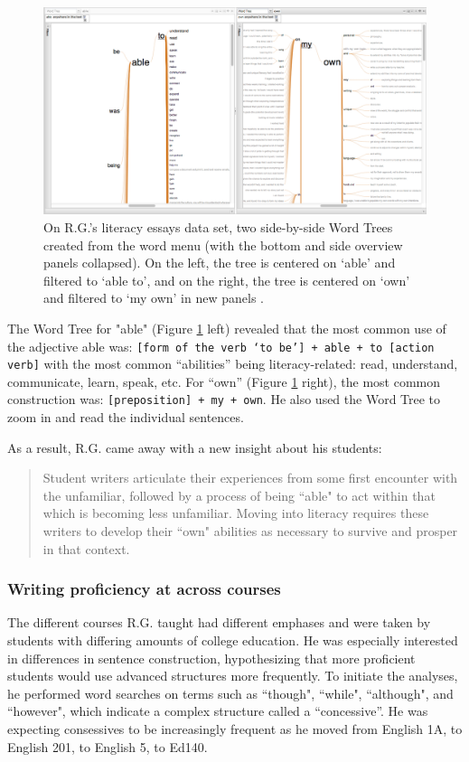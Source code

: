 \documentclass{sig-alternate}
\newcommand{\code}[1] {\texttt{#1}}
\begin{document}
\begin{figure}[h!]
\includegraphics[width=\textwidth]{fig/rex/04.png}
\caption{ On R.G.'s literacy essays data set, two side-by-side Word Trees created from the word menu (with the bottom and side overview panels collapsed). On the left, the tree is centered on `able' and filtered to `able to', and on the right, the tree is centered on  `own' and filtered to `my own' in new panels \label{fig:rex04}.}
\end{figure}

The Word Tree for "able" (Figure \ref{fig:rex04} left) revealed that the most common use of the adjective able was: \code{[form of the verb `to be'] + able + to [action verb]} with the most common ``abilities'' being literacy-related: read, understand, communicate, learn, speak, etc.  For ``own'' (Figure \ref{fig:rex04} right), the most common construction was: \code{[preposition] + my + own}.  He also used the Word Tree to zoom in and read the individual sentences.

As a result, R.G. came away with a new insight about his students:
\begin{quote}
Student writers articulate their experiences from some first encounter with the unfamiliar, followed by a process of being ``able" to act within that which is becoming less unfamiliar.  Moving into literacy requires these writers to develop their ``own" abilities as necessary to survive and prosper in that context.
\end{quote} 

\subsubsection{Writing proficiency at across courses}
The different courses R.G. taught had different emphases and were taken by students with differing amounts of college education. He was especially interested in differences in sentence construction, hypothesizing that more proficient students would use advanced structures more frequently. To initiate the analyses, he performed word searches on terms such as ``though", ``while", ``although", and ``however", which indicate a complex structure called a ``concessive''. He was expecting consessives to be increasingly frequent as he moved from English 1A, to English 201, to English 5, to Ed140.
\end{document}

